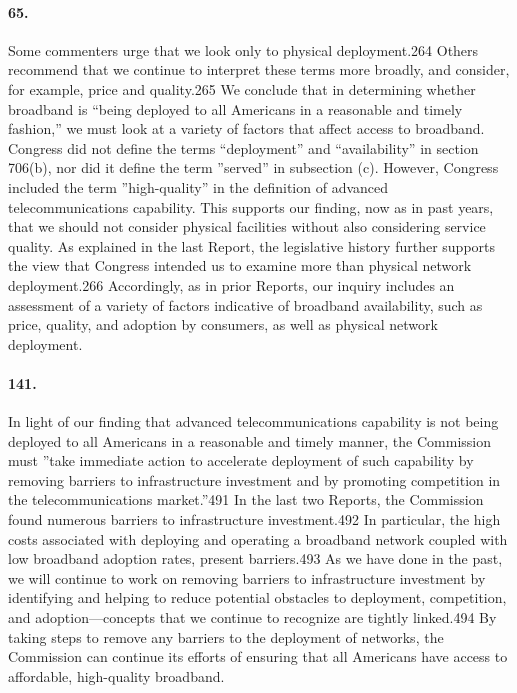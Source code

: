 \paragraph{65. } Some commenters urge that we look only to physical deployment.264 Others recommend
that we continue to interpret these terms more broadly, and consider, for example, price and quality.265 We conclude that in determining whether broadband is ``being deployed to all Americans in a reasonable and timely fashion,'' we must look at a variety of factors that affect access to broadband. Congress did not define the terms ``deployment'' and ``availability'' in section 706(b), nor did it define the term ''served'' in subsection (c). However, Congress included the term ''high-quality'' in the definition of advanced telecommunications capability. This supports our finding, now as in past years, that we should not consider physical facilities without also considering service quality. As explained in the last Report, the legislative history further supports the view that Congress intended us to examine more than physical network deployment.266 Accordingly, as in prior Reports, our inquiry includes an assessment of a variety of factors indicative of broadband availability, such as price, quality, and adoption by consumers, as well as physical network deployment.

\paragraph{141. }
In light of our finding that advanced telecommunications capability is not being deployed to all Americans in a reasonable and timely manner, the Commission must ''take immediate action to accelerate deployment of such capability by removing barriers to infrastructure investment and by promoting competition in the telecommunications market.''491 In the last two Reports, the Commission found numerous barriers to infrastructure investment.492 In particular, the high costs associated with deploying and operating a broadband network coupled with low broadband adoption rates, present barriers.493 As we have done in the past, we will continue to work on removing barriers to infrastructure investment by identifying and helping to reduce potential obstacles to deployment, competition, and adoption—concepts that we continue to recognize are tightly linked.494 By taking steps to remove any barriers to the deployment of networks, the Commission can continue its efforts of ensuring that all Americans have access to affordable, high-quality broadband.

